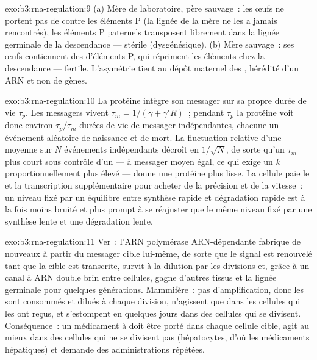 \begin{solution}{exo:b3:rna-regulation:9}
(a) Mère de laboratoire, père sauvage~: les œufs ne portent pas de
 contre les éléments P (la lignée de la mère ne les a jamais
rencontrés), les éléments P paternels transposent librement dans la
lignée germinale de la descendance --- stérile (dysgénésique). (b) Mère
sauvage~: ses œufs contiennent des  d'éléments P, qui répriment
les éléments chez la descendance --- fertile. L'asymétrie tient au
dépôt maternel des , hérédité d'un ARN et non de gènes.
\end{solution}

\begin{solution}{exo:b3:rna-regulation:10}
La protéine intègre son messager sur sa propre durée de vie
$\tau_{p}$. Les messagers vivent $\tau_{m} = 1/(\gamma + \gamma' R)$~;
pendant $\tau_{p}$ la protéine voit donc environ $\tau_{p}/\tau_{m}$
durées de vie de messager indépendantes, chacune un événement aléatoire
de naissance et de mort. La fluctuation relative d'une moyenne sur $N$
événements indépendants décroît en $1/\sqrt{N}$, de sorte qu'un
$\tau_{m}$ plus court sous contrôle d'un  --- à messager moyen
égal, ce qui exige un $k$ proportionnellement plus élevé --- donne une
protéine plus lisse. La cellule paie le  et la transcription
supplémentaire pour acheter de la précision et de la vitesse~: un
niveau fixé par un équilibre entre synthèse rapide et dégradation
rapide est à la fois moins bruité et plus prompt à se réajuster que le
même niveau fixé par une synthèse lente et une dégradation lente.
\end{solution}

\begin{solution}{exo:b3:rna-regulation:11}
Ver~: l'ARN polymérase ARN-dépendante fabrique de nouveaux  à
partir du messager cible lui-même, de sorte que le signal est renouvelé
tant que la cible est transcrite, survit à la dilution par les
divisions et, grâce à un canal à ARN double brin entre cellules, gagne
d'autres tissus et la lignée germinale pour quelques générations.
Mammifère~: pas d'amplification, donc les  sont consommés et
dilués à chaque division, n'agissent que dans les cellules qui les ont
reçus, et s'estompent en quelques jours dans des cellules qui se
divisent. Conséquence~: un médicament à  doit être porté dans
chaque cellule cible, agit au mieux dans des cellules qui ne se
divisent pas (hépatocytes, d'où les médicaments hépatiques) et demande
des administrations répétées.
\end{solution}

